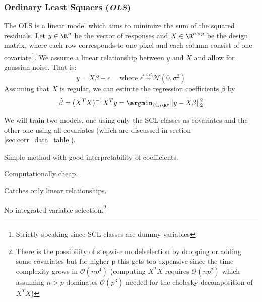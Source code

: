 
\subsubsection*{Ordinary Least Squaers (\textit{OLS})}{
    The OLS is a linear model which aims to minimize the sum of the squared residuals. Let $y\in \R^n$ be the vector of responses and $X\in \R^{n\times p}$ be the design matrix, where each row corresponds to one pixel and each column consist of one covariate\footnote{Strictly speaking since SCL-classes are dummy variables }. We assume a linear relationship between $y$ and $X$ and allow for gaussian noise. That is:
    \begin{equation}
        \label{eq:ols}
        y = X\beta  + \epsilon \quad \text{ where }\epsilon \overset{i.i.d.}{\sim}\mathcal{N}(0,\sigma^2)
    \end{equation}
    Assuming that $X$ is regular, we can estimte the regression coefficients $\beta$ by
    \begin{equation}
        \hat \beta = (X^TX)^{-1}X^Ty = \argmin_{\beta in \R^p}\|y - X\beta\|_2^2 
    \end{equation}

    We will train two models, one using only the SCL-classes as covariates and the other one using all covariates (which are discussed in section \ref{sec:corr_data_table}).

    \begin{my_pros_cons_table}{
        \item Simple method with good interpretability of coefficients.
        \item Computationally cheap.
    }{
        \item Catches only linear relationships.
        \item No integrated variable selection.\footnote{There is the possibility of stepwise modelselection by dropping or adding some covariates but for higher p this gets too expensive since the time complexity grows in $\mathcal{O}(np^4)$ (computing $X^TX$ requires $\mathcal{O}(np^2)$ which assuming $n>p$ dominates $\mathcal{O}(p^3) $ needed for the cholesky-decomposition of $X^TX$) %
        }
    }
    \end{my_pros_cons_table}
}
